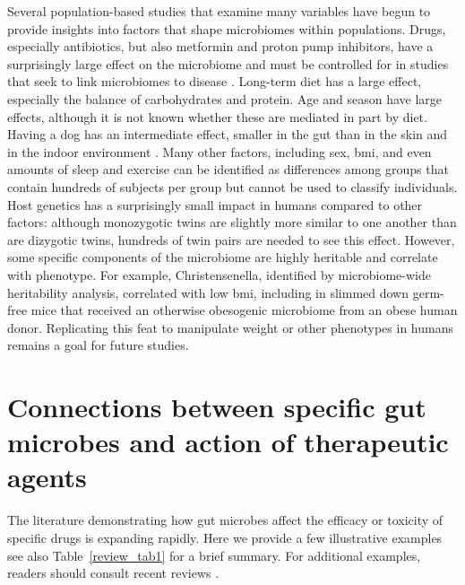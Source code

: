 Several population-based studies that examine many variables have begun to provide insights into factors that shape microbiomes within populations. Drugs, especially antibiotics, but also metformin and proton pump inhibitors, have a surprisingly large effect on the microbiome and must be controlled for in studies that seek to link microbiomes to disease \cite{RN4080}. Long-term diet has a large effect, especially the balance of carbohydrates and protein. Age and season have large effects, although it is not known whether these are mediated in part by diet. Having a dog has an intermediate effect, smaller in the gut than in the skin and in the indoor environment \cite{RN4083, RN4082}. Many other factors, including sex, \gls{bmi}, and even amounts of sleep and exercise can be identified as differences among groups that contain hundreds of subjects per group but cannot be used to classify individuals. Host genetics has a surprisingly small impact in humans compared to other factors: although monozygotic twins are slightly more similar to one another than are dizygotic twins, hundreds of twin pairs are needed to see this effect. However, some specific components of the microbiome are highly heritable and correlate with phenotype. For example, Christensenella, identified by microbiome-wide heritability analysis, correlated with low \gls{bmi}, including in slimmed down germ-free mice that received an otherwise obesogenic microbiome from an obese human donor. Replicating this feat to manipulate weight or other phenotypes in humans remains a goal for future studies.

\section{Connections between specific gut microbes and action of therapeutic agents}
  
The literature demonstrating how gut microbes affect the efficacy or toxicity of specific drugs is expanding rapidly. Here we provide a few illustrative examples see also Table~\ref{review_tab1} for a brief summary. For additional examples, readers should  consult recent reviews \cite{RN4084,RN4086}.

